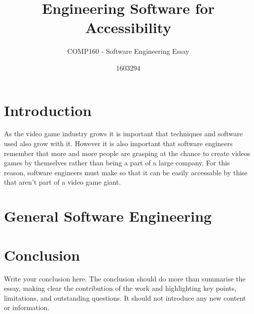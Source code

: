 \documentclass{scrartcl}
\title{Engineering Software for Accessibility}
\subtitle{COMP160 - Software Engineering Essay}
\author{1603294}
\begin{document}
\maketitle


\section{Introduction}

As the video game industry grows it is important that techniques and software used also grow with it. However it is also important that software engineers remember that more and more people are grasping at the chance to create videos games by themselves rather than being a part of a large company. For this reason, software engineers must make so that it can be easily accessable by thise that aren't part of a video game giant.

\section{General Software Engineering}


\section{Conclusion}

Write your conclusion here. The conclusion should do more than summarise the essay, making clear the contribution of the work and highlighting key points, limitations, and outstanding questions. It should not introduce any new content or information.



\end{document}
